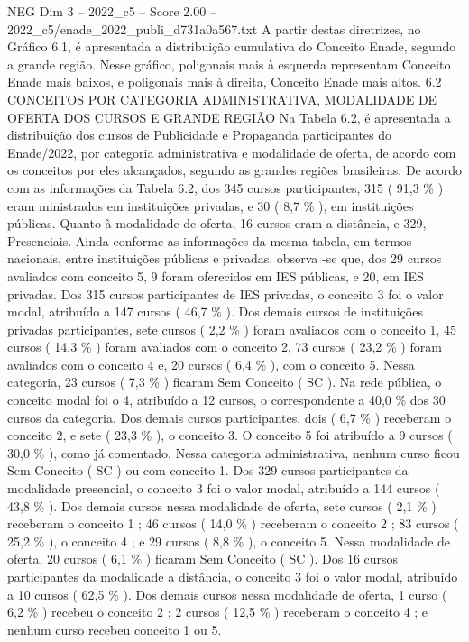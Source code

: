 \begin{textsample}{NEG Dim 3 – 2022\_c5 – Score 2.00 – 2022\_c5/enade\_2022\_publi\_d731a0a567.txt}
A partir destas diretrizes, no Gráfico 6.1, é apresentada a distribuição cumulativa do Conceito Enade, segundo a grande região.
Nesse gráfico, poligonais mais à esquerda representam Conceito Enade mais baixos, e poligonais mais à direita, Conceito Enade mais altos. 6.2 CONCEITOS POR CATEGORIA ADMINISTRATIVA, MODALIDADE DE OFERTA DOS CURSOS E GRANDE REGIÃO Na Tabela 6.2, é apresentada a distribuição dos cursos de Publicidade e Propaganda participantes do Enade/2022, por categoria administrativa e modalidade de oferta, de acordo com os conceitos por eles alcançados, segundo as grandes regiões brasileiras.
De acordo com as informações da Tabela 6.2, dos 345 cursos participantes, 315 ( 91,3 \% ) eram ministrados em instituições privadas, e 30 ( 8,7 \% ), em instituições públicas.
Quanto à modalidade de oferta, 16 cursos eram a distância, e 329, Presenciais.
Ainda conforme as informações da mesma tabela, em termos nacionais, entre instituições públicas e privadas, observa -se que, dos 29 cursos avaliados com conceito 5, 9 foram oferecidos em IES públicas, e 20, em IES privadas.
Dos 315 cursos participantes de IES privadas, o conceito 3 foi o valor modal, atribuído a 147 cursos ( 46,7 \% ).
Dos demais cursos de instituições privadas participantes, sete cursos ( 2,2 \% ) foram avaliados com o conceito 1, 45 cursos ( 14,3 \% ) foram avaliados com o conceito 2, 73 cursos ( 23,2 \% ) foram avaliados com o conceito 4 e, 20 cursos ( 6,4 \% ), com o conceito 5.
Nessa categoria, 23 cursos ( 7,3 \% ) ficaram Sem Conceito ( SC ).
Na rede pública, o conceito modal foi o 4, atribuído a 12 cursos, o correspondente a 40,0 \% dos 30 cursos da categoria.
Dos demais cursos participantes, dois ( 6,7 \% ) receberam o conceito 2, e sete ( 23,3 \% ), o conceito 3.
O conceito 5 foi atribuído a 9 cursos ( 30,0 \% ), como já comentado.
Nessa categoria administrativa, nenhum curso ficou Sem Conceito ( SC ) ou com conceito 1.
Dos 329 cursos participantes da modalidade presencial, o conceito 3 foi o valor modal, atribuído a 144 cursos ( 43,8 \% ).
Dos demais cursos nessa modalidade de oferta, sete cursos ( 2,1 \% ) receberam o conceito 1 ; 46 cursos ( 14,0 \% ) receberam o conceito 2 ; 83 cursos ( 25,2 \% ), o conceito 4 ; e 29 cursos ( 8,8 \% ), o conceito 5.
Nessa modalidade de oferta, 20 cursos ( 6,1 \% ) ficaram Sem Conceito ( SC ).
Dos 16 cursos participantes da modalidade a distância, o conceito 3 foi o valor modal, atribuído a 10 cursos ( 62,5 \% ).
Dos demais cursos nessa modalidade de oferta, 1 curso ( 6,2 \% ) recebeu o conceito 2 ; 2 cursos ( 12,5 \% ) receberam o conceito 4 ; e nenhum curso recebeu conceito 1 ou 5.

\end{textsample}
